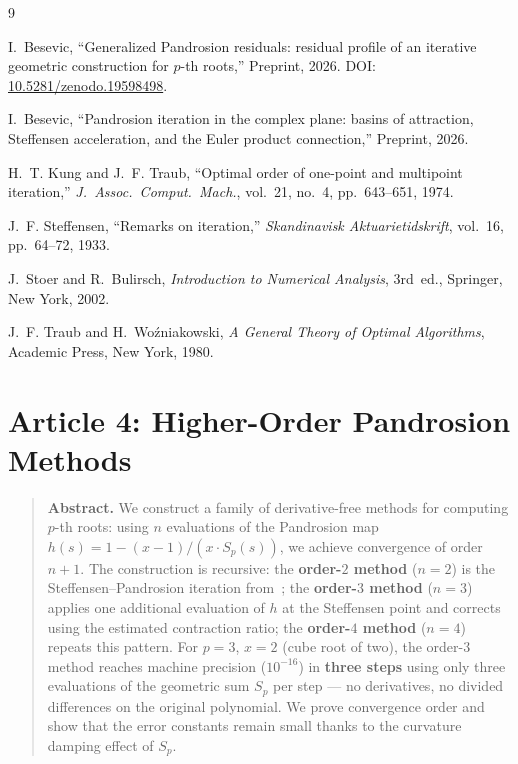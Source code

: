\documentclass[10pt,a4paper,oneside]{book}
\theoremstyle{definition}
\theoremstyle{remark}
\newenvironment{abstract}{\begin{quote}\small\textbf{Abstract.}}{\end{quote}}
\begin{document}
\begin{thebibliography}{9}

I.~Besevic,
``Generalized Pandrosion residuals: residual profile of an iterative geometric construction for $p$-th roots,''
Preprint, 2026.
DOI: \href{https://doi.org/10.5281/zenodo.19598498}{10.5281/zenodo.19598498}.

I.~Besevic,
``Pandrosion iteration in the complex plane: basins of attraction, Steffensen acceleration, and the Euler product connection,''
Preprint, 2026.

H.~T. Kung and J.~F. Traub,
``Optimal order of one-point and multipoint iteration,''
\textit{J.~Assoc.\ Comput.\ Mach.}, vol.~21, no.~4, pp.~643--651, 1974.

J.~F. Steffensen,
``Remarks on iteration,''
\textit{Skandinavisk Aktuarietidskrift}, vol.~16, pp.~64--72, 1933.

J.~Stoer and R.~Bulirsch,
\textit{Introduction to Numerical Analysis},
3rd~ed., Springer, New York, 2002.

J.~F. Traub and H.~Wo\'{z}niakowski,
\textit{A General Theory of Optimal Algorithms},
Academic Press, New York, 1980.

\end{thebibliography}





\chapter{Article 4: Higher-Order Pandrosion Methods}
\graphicspath{{../}{../../figures/}{../smale/figures/}}


\begin{abstract}
We construct a family of derivative-free methods for computing $p$-th roots: using $n$ evaluations of the Pandrosion map $h(s) = 1 - (x-1)/(x\cdot S_p(s))$, we achieve convergence of order $n+1$.  The construction is recursive: the \textbf{order-$2$ method} ($n=2$) is the Steffensen--Pandrosion iteration from~\cite{besevic2026}; the \textbf{order-$3$ method} ($n=3$) applies one additional evaluation of $h$ at the Steffensen point and corrects using the estimated contraction ratio; the \textbf{order-$4$ method} ($n=4$) repeats this pattern.  For $p=3$, $x=2$ (cube root of two), the order-$3$ method reaches machine precision ($10^{-16}$) in \textbf{three steps} using only three evaluations of the geometric sum $S_p$ per step --- no derivatives, no divided differences on the original polynomial.  We prove convergence order and show that the error constants remain small thanks to the curvature damping effect of $S_p$.
\end{abstract}
\end{document}
